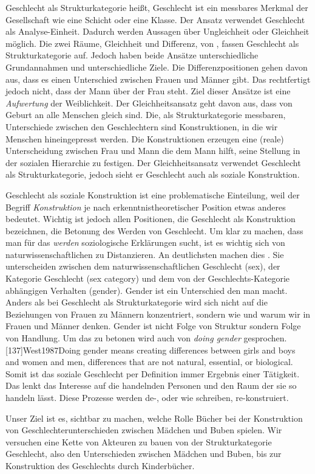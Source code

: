   Geschlecht als Strukturkategorie heißt, Geschlecht ist ein messbares Merkmal
  der Gesellschaft wie eine Schicht oder eine Klasse. Der Ansatz verwendet
  Geschlecht als Analyse-Einheit. Dadurch werden Aussagen über Ungleichheit oder
  Gleichheit möglich.  Die zwei Räume, Gleichheit und Differenz, von
  \citeauthor{Nissen1998}, fassen Geschlecht als Strukturkategorie auf. Jedoch
  haben beide Ansätze unterschiedliche Grundannahmen und unterschiedliche Ziele.
  Die Differenzpositionen gehen davon aus, dass es einen Unterschied zwischen
  Frauen und Männer gibt. Das rechtfertigt jedoch nicht, dass der Mann über der
  Frau steht. Ziel dieser Ansätze ist eine \emph{Aufwertung} der Weiblichkeit.
  Der Gleichheitsansatz geht davon aus, dass von Geburt an alle Menschen gleich
  sind.  Die, als Strukturkategorie messbaren, Unterschiede zwischen den
  Geschlechtern sind Konstruktionen, in die wir Menschen hineingepresst werden.
  Die Konstruktionen erzeugen eine (reale) Unterscheidung zwischen Frau und Mann
  die dem Mann hilft, seine Stellung in der sozialen Hierarchie zu festigen.
  \parencite[181]{Hertz2007}  Der Gleichheitsansatz verwendet
  Geschlecht als Strukturkategorie, jedoch sieht er Geschlecht auch als soziale
  Konstruktion.

  Geschlecht als soziale Konstruktion ist eine problematische Einteilung, weil
  der Begriff \emph{Konstruktion} je nach erkenntnistheoretischer Position etwas
  anderes bedeutet. \parencite[219]{Gildemeister2000} Wichtig ist jedoch allen
  Positionen, die Geschlecht als Konstruktion bezeichnen, die Betonung des
  Werden von Geschlecht. Um klar zu machen, dass man für das \emph{werden}
  soziologische Erklärungen sucht, ist es wichtig sich von
  naturwissenschaftlichen zu Distanzieren. An deutlichsten machen dies
  . Sie unterscheiden zwischen dem
  naturwissenschaftlichen Geschlecht (sex), der Kategorie Geschlecht (sex
  category) und dem von der Geschlechts-Kategorie abhängigen Verhalten (gender).
  Gender ist ein Unterschied den man macht. Anders als bei Geschlecht als
  Strukturkategorie wird sich nicht auf die Beziehungen von Frauen zu Männern
  konzentriert, sondern wie und warum wir in Frauen und Männer denken. Gender
  ist nicht Folge von Struktur sondern Folge von Handlung. Um das zu betonen
  wird auch von \emph{doing gender} gesprochen.
  [137]{West1987}{Doing gender means creating
  differences between girls and boys and women and men, differences that are not
  natural, essential, or biological.} Somit ist das soziale Geschlecht per
  Definition immer Ergebnis einer Tätigkeit. Das lenkt das Interesse auf die
  handelnden Personen und den Raum der sie so handeln lässt. Diese Prozesse
  werden de-, oder wie  schreiben, re-konstruiert.

  Unser Ziel ist es, sichtbar zu machen, welche Rolle Bücher bei der
  Konstruktion von Geschlechterunterschieden zwischen Mädchen und Buben spielen.
  Wir versuchen eine Kette von Akteuren zu bauen von der Strukturkategorie
  Geschlecht, also den Unterschieden zwischen Mädchen und Buben, bis zur
  Konstruktion des Geschlechts durch Kinderbücher.
